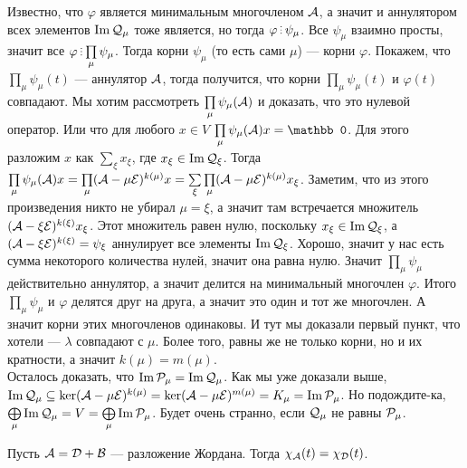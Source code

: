 \documentclass{article}
\DeclareMathOperator{\operIm}{Im}
\let\Im\operIm
\newcommand*{\id}{{\scriptE}}
\begin{document}
\begin{itemize}
\begin{Proof}
            Известно, что $\varphi$ является минимальным многочленом ${\mathcal{A}}$, а значит и аннулятором всех элементов $\Im\scriptQ_\mu$ тоже является, но тогда $\varphi\divby\psi_\mu$. Все $\psi_\mu$ взаимно просты, значит все $\varphi\divby\prod\limits_{\mu}\psi_\mu$. Тогда корни $\psi_\mu$ (то есть сами $\mu$) --- корни $\varphi$. Покажем, что $\prod\limits_{\mu}\psi_\mu(t)$ --- аннулятор ${\mathcal{A}}$, тогда получится, что корни $\prod\limits_{\mu}\psi_\mu(t)$ и $\varphi(t)$ совпадают. Мы хотим рассмотреть $\prod\limits_{\mu}\psi_\mu({\mathcal{A}})$ и доказать, что это нулевой оператор. Или что для любого $x\in V$ $\prod\limits_{\mu}\psi_\mu(\scriptA)x=\mathbb0$. Для этого разложим $x$ как $\sum\limits_\xi x_\xi$, где $x_\xi\in\Im\scriptQ_\xi$. Тогда $\prod\limits_{\mu}\psi_\mu(\scriptA)x=\prod\limits_{\mu}(\scriptA-\mu\id)^{k(\mu)}x=\sum\limits_\xi\prod\limits_{\mu}(\scriptA-\mu\id)^{k(\mu)}x_\xi$. Заметим, что из этого произведения никто не убирал $\mu=\xi$, а значит там встречается множитель $(\scriptA-\xi\id)^{k(\xi)}x_\xi$. Этот множитель равен нулю, поскольку $x_\xi\in\Im\scriptQ_\xi$, а $(\scriptA-\xi\id)^{k(\xi)}=\psi_\xi$ аннулирует все элементы $\Im\scriptQ_\xi$. Хорошо, значит у нас есть сумма некоторого количества нулей, значит она равна нулю. Значит $\prod\limits_{\mu}\psi_\mu$ действительно аннулятор, а значит делится на минимальный многочлен $\varphi$. Итого $\prod\limits_{\mu}\psi_\mu$ и $\varphi$ делятся друг на друга, а значит это один и тот же многочлен. А значит корни этих многочленов одинаковы. И тут мы доказали первый пункт, что хотели --- $\lambda$ совпадают с $\mu$. Более того, равны же не только корни, но и их кратности, а значит $k(\mu)=m(\mu)$.\\
            Осталось доказать, что $\Im\scriptP_\mu=\Im\scriptQ_\mu$. Как мы уже доказали выше, $\Im\scriptQ_\mu\subseteq\ker(\scriptA-\mu\id)^{k(\mu)}=\ker(\scriptA-\mu\id)^{m(\mu)}=K_\mu=\Im\scriptP_\mu$. Но подождите-ка, $\bigoplus\limits_\mu\Im\scriptQ_\mu=V=\bigoplus\limits_\mu\Im\scriptP_\mu$. Будет очень странно, если ${\mathcal{Q}}_\mu$ не равны ${\mathcal{P}}_\mu$.
        \end{Proof}
        \thm Пусть ${\mathcal{A}}={\mathcal{D}}+{\mathcal{B}}$ --- разложение Жордана. Тогда $\chi_{\mathcal{A}}(t)=\chi_{\mathcal{D}}(t)$.
        \begin{Proof}

\end{Proof}
\end{itemize}
\end{document}
